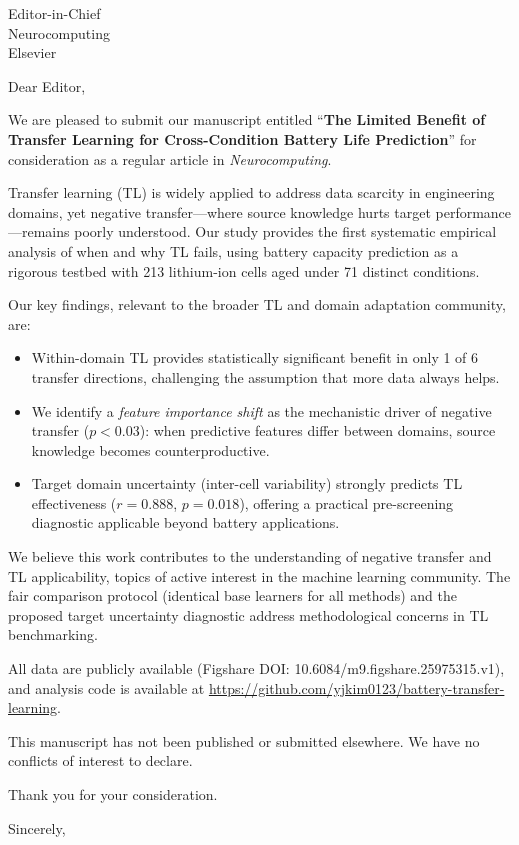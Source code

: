 \documentclass[11pt]{letter}
\begin{document}
\begin{letter}{Editor-in-Chief\\Neurocomputing\\Elsevier}

\opening{Dear Editor,}

We are pleased to submit our manuscript entitled ``\textbf{The Limited Benefit of Transfer Learning for Cross-Condition Battery Life Prediction}'' for consideration as a regular article in \textit{Neurocomputing}.

Transfer learning (TL) is widely applied to address data scarcity in engineering domains, yet negative transfer---where source knowledge hurts target performance---remains poorly understood. Our study provides the first systematic empirical analysis of when and why TL fails, using battery capacity prediction as a rigorous testbed with 213 lithium-ion cells aged under 71 distinct conditions.

Our key findings, relevant to the broader TL and domain adaptation community, are:
\begin{itemize}
    \item Within-domain TL provides statistically significant benefit in only 1 of 6 transfer directions, challenging the assumption that more data always helps.
    \item We identify a \textit{feature importance shift} as the mechanistic driver of negative transfer ($p < 0.03$): when predictive features differ between domains, source knowledge becomes counterproductive.
    \item Target domain uncertainty (inter-cell variability) strongly predicts TL effectiveness ($r = 0.888$, $p = 0.018$), offering a practical pre-screening diagnostic applicable beyond battery applications.
\end{itemize}

We believe this work contributes to the understanding of negative transfer and TL applicability, topics of active interest in the machine learning community. The fair comparison protocol (identical base learners for all methods) and the proposed target uncertainty diagnostic address methodological concerns in TL benchmarking.

All data are publicly available (Figshare DOI: 10.6084/m9.figshare.25975315.v1), and analysis code is available at \url{https://github.com/yjkim0123/battery-transfer-learning}.

This manuscript has not been published or submitted elsewhere. We have no conflicts of interest to declare.

Thank you for your consideration.

\closing{Sincerely,}

\end{letter}
\end{document}
